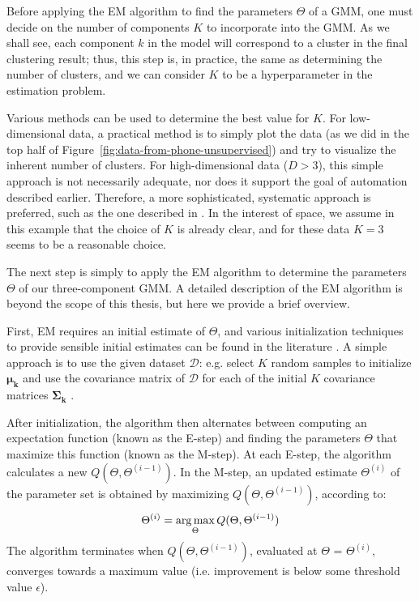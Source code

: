 Before applying the EM algorithm to find the parameters $\Theta$ of a GMM, one must decide on the number of components $K$ to incorporate into the GMM. As we shall see, each component $k$ in the model will correspond to a cluster in the final clustering result; thus, this step is, in practice, the same as determining the number of clusters, and we can consider $K$ to be a hyperparameter in the estimation problem.

Various methods can be used to determine the best value for $K$. For low-dimensional data, a practical method is to simply plot the data (as we did in the top half of Figure~\ref{fig:data-from-phone-unsupervised}) and try to visualize the inherent number of clusters. For high-dimensional data ($D>3$), this simple approach is not necessarily adequate, nor does it support the goal of automation described earlier. Therefore, a more sophisticated, systematic approach is preferred, such as the one described in \cite{vlassis2002greedy}. In the interest of space, we assume in this example that the choice of $K$ is already clear, and for these data $K=3$ seems to be a reasonable choice.

The next step is simply to apply the EM algorithm to determine the parameters $\Theta$ of our three-component GMM. A detailed description of the EM algorithm is beyond the scope of this thesis, but here we provide a brief overview.

First, EM requires an initial estimate of $\Theta$, and various initialization techniques to provide sensible initial estimates can be found in the literature . A simple approach is to use the given dataset $\mathcal{D}$: e.g. select $K$ random samples to initialize $\boldsymbol{\mu_k}$ and use the covariance matrix of $\mathcal{D}$ for each of the initial $K$ covariance matrices $\boldsymbol{\Sigma_k}$ \cite{Smyth2015}.

After initialization, the algorithm then alternates between computing an expectation function (known as the E-step) and finding the parameters $\Theta$ that maximize this function (known as the M-step). At each E-step, the algorithm calculates a new $Q(\Theta,\Theta^{(i-1)})$. In the M-step, an updated estimate $\Theta^{(i)}$ of the parameter set is obtained by maximizing $Q(\Theta,\Theta^{(i-1)})$, according to:
%
\begin{equation}
 \Theta^{(i)} = \operatorname*{arg\,max}_\Theta{Q(\Theta,\Theta^{(i-1)})}
\end{equation}
%
The algorithm terminates when $Q(\Theta,\Theta^{(i-1)})$, evaluated at $\Theta$ = $\Theta^{(i)}$, converges towards a maximum value (i.e. improvement is below some threshold value $\epsilon$).

